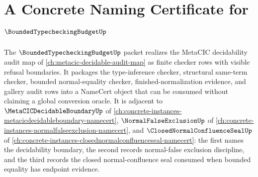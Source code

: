 \chapter{A Concrete Naming Certificate for $\BoundedTypecheckingBudgetUp$}
\label{ch:concrete-instances-bounded-typechecking-budget-namecert}

The $\BoundedTypecheckingBudgetUp$ packet realizes the MetaCIC decidability audit map of \autoref{ch:metacic-decidable-audit-map} as finite checker rows with visible refusal boundaries. It packages the type-inference checker, structural same-term checker, bounded normal-equality checker, finished-normalization evidence, and gallery audit rows into a NameCert object that can be consumed without claiming a global conversion oracle. It is adjacent to $\MetaCICDecidableBoundaryUp$ of \autoref{ch:concrete-instances-metacicdecidableboundary-namecert}, $\NormalFalseExclusionUp$ of \autoref{ch:concrete-instances-normalfalseexclusion-namecert}, and $\ClosedNormalConfluenceSealUp$ of \autoref{ch:concrete-instances-closednormalconfluenceseal-namecert}: the first names the decidability boundary, the second records normal-false exclusion discipline, and the third records the closed normal-confluence seal consumed when bounded equality has endpoint evidence.

